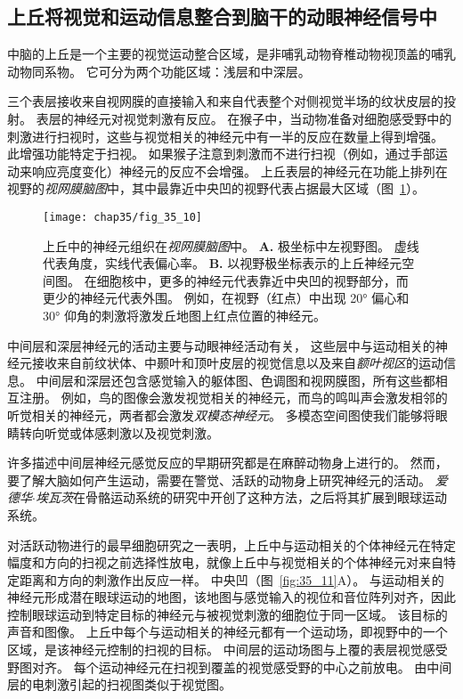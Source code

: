 \subsection{上丘将视觉和运动信息整合到脑干的动眼神经信号中}

中脑的上丘是一个主要的视觉运动整合区域，是非哺乳动物脊椎动物视顶盖的哺乳动物同系物。
它可分为两个功能区域：浅层和中深层。


三个表层接收来自视网膜的直接输入和来自代表整个对侧视觉半场的纹状皮层的投射。
表层的神经元对视觉刺激有反应。
在猴子中，当动物准备对细胞感受野中的刺激进行扫视时，这些与视觉相关的神经元中有一半的反应在数量上得到增强。
此增强功能特定于扫视。
如果猴子注意到刺激而不进行扫视（例如，通过手部运动来响应亮度变化）神经元的反应不会增强。
上丘表层的神经元在功能上排列在视野的\textit{视网膜脑图}中，其中最靠近中央凹的视野代表占据最大区域（图~\ref{fig:35_10}）。


\begin{figure}[htbp]
	\centering
	\texttt{[image: chap35/fig\_35\_10]}
	\caption{上丘中的神经元组织在\textit{视网膜脑图}中。
		\textbf{A.} 极坐标中左视野图。
		虚线代表角度，实线代表偏心率。
		\textbf{B.} 以视野极坐标表示的上丘神经元空间图。
		在细胞核中，更多的神经元代表靠近中央凹的视野部分，而更少的神经元代表外围。
		例如，在视野（红点）中出现 20° 偏心和 30° 仰角的刺激将激发丘地图上红点位置的神经元\cite{aizawa1998reversible}。}
	\label{fig:35_10}
\end{figure}


中间层和深层神经元的活动主要与动眼神经活动有关，
这些层中与运动相关的神经元接收来自前纹状体、中颞叶和顶叶皮层的视觉信息以及来自\textit{额叶视区}的运动信息。
中间层和深层还包含感觉输入的躯体图、色调图和视网膜图，所有这些都相互注册。
例如，鸟的图像会激发视觉相关的神经元，而鸟的鸣叫声会激发相邻的听觉相关的神经元，两者都会激发\textit{双模态神经元}。
多模态空间图使我们能够将眼睛转向听觉或体感刺激以及视觉刺激。


许多描述中间层神经元感觉反应的早期研究都是在麻醉动物身上进行的。
然而，要了解大脑如何产生运动，需要在警觉、活跃的动物身上研究神经元的活动。
\textit{爱德华$\cdot$埃瓦茨}在骨骼运动系统的研究中开创了这种方法，之后将其扩展到眼球运动系统。


对活跃动物进行的最早细胞研究之一表明，上丘中与运动相关的个体神经元在特定幅度和方向的扫视之前选择性放电，就像上丘中与视觉相关的个体神经元对来自特定距离和方向的刺激作出反应一样。
中央凹（图~\ref{fig:35_11}A）。
与运动相关的神经元形成潜在眼球运动的地图，该地图与感觉输入的视位和音位阵列对齐，因此控制眼球运动到特定目标的神经元与被视觉刺激的细胞位于同一区域。
该目标的声音和图像。
上丘中每个与运动相关的神经元都有一个运动场，即视野中的一个区域，是该神经元控制的扫视的目标。
中间层的运动场图与上覆的表层视觉感受野图对齐。
每个运动神经元在扫视到覆盖的视觉感受野的中心之前放电。
由中间层的电刺激引起的扫视图类似于视觉图。


